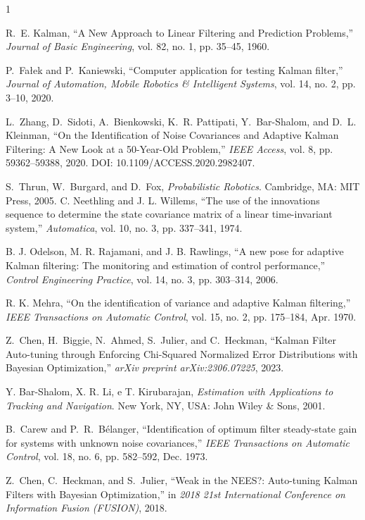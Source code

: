 \documentclass[journal]{IEEEtran}
\begin{document}
\begin{thebibliography}{1}

R.~E. Kalman, ``A New Approach to Linear Filtering and Prediction Problems,'' \emph{Journal of Basic Engineering}, vol. 82, no. 1, pp. 35--45, 1960.

P.~Fałek and P.~Kaniewski, ``Computer application for testing Kalman filter,'' \emph{Journal of Automation, Mobile Robotics \& Intelligent Systems}, vol. 14, no. 2, pp. 3--10, 2020.

L.~Zhang, D.~Sidoti, A.~Bienkowski, K.~R. Pattipati, Y.~Bar-Shalom, and D.~L. Kleinman, ``On the Identification of Noise Covariances and Adaptive Kalman Filtering: A New Look at a 50-Year-Old Problem,'' \emph{IEEE Access}, vol. 8, pp. 59362--59388, 2020. DOI: 10.1109/ACCESS.2020.2982407.

S.~Thrun, W.~Burgard, and D.~Fox, \emph{Probabilistic Robotics}. Cambridge, MA: MIT Press, 2005.
C. Neethling and J. L. Willems, ``The use of the innovations sequence to determine the state covariance matrix of a linear time-invariant system,'' \textit{Automatica}, vol. 10, no. 3, pp. 337--341, 1974.

B. J. Odelson, M. R. Rajamani, and J. B. Rawlings, ``A new pose for adaptive Kalman filtering: The monitoring and estimation of control performance,'' \textit{Control Engineering Practice}, vol. 14, no. 3, pp. 303--314, 2006.

R. K. Mehra, ``On the identification of variance and adaptive Kalman filtering,'' \textit{IEEE Transactions on Automatic Control}, vol. 15, no. 2, pp. 175--184, Apr. 1970.

Z.~Chen, H.~Biggie, N.~Ahmed, S.~Julier, and C.~Heckman, ``Kalman Filter Auto-tuning through Enforcing Chi-Squared Normalized Error Distributions with Bayesian Optimization,'' \emph{arXiv preprint arXiv:2306.07225}, 2023.

Y. Bar-Shalom, X. R. Li, e T. Kirubarajan, \textit{Estimation with Applications to Tracking and Navigation}. New York, NY, USA: John Wiley \& Sons, 2001.

B.~Carew and P.~R.~Bélanger, ``Identification of optimum filter steady-state gain for systems with unknown noise covariances,'' \emph{IEEE Transactions on Automatic Control}, vol. 18, no. 6, pp. 582--592, Dec. 1973.

Z.~Chen, C.~Heckman, and S.~Julier, ``Weak in the NEES?: Auto-tuning Kalman Filters with Bayesian Optimization,'' in \emph{2018 21st International Conference on Information Fusion (FUSION)}, 2018.

\end{thebibliography}
\end{document}
